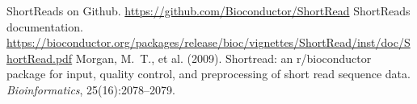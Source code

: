 \documentclass[12pt]{article}
\begin{document}
\begin{thebibliography}{10}
ShortReads on Github.
\newblock \url{https://github.com/Bioconductor/ShortRead}
ShortReads documentation.
\newblock \url{https://bioconductor.org/packages/release/bioc/vignettes/ShortRead/inst/doc/ShortRead.pdf}
Morgan, M.~T., et al. (2009).
\newblock Shortread: an r/bioconductor package for input, quality control, and
  preprocessing of short read sequence data.
\newblock \emph{Bioinformatics}, 25(16):2078--2079.
\end{thebibliography}
\end{document}
